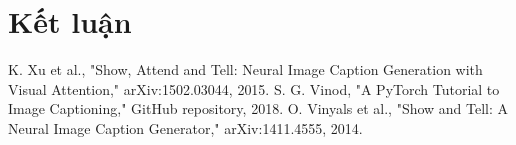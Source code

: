 \documentclass[conference]{IEEEtran}
\begin{document}
\section{Kết luận}

\begin{thebibliography}{00}
 K. Xu et al., "Show, Attend and Tell: Neural Image Caption Generation with Visual Attention," arXiv:1502.03044, 2015.
 S. G. Vinod, "A PyTorch Tutorial to Image Captioning," GitHub repository, 2018.
 O. Vinyals et al., "Show and Tell: A Neural Image Caption Generator," arXiv:1411.4555, 2014.
\end{thebibliography}
\vspace{12pt}
\color{red}
\end{document}
